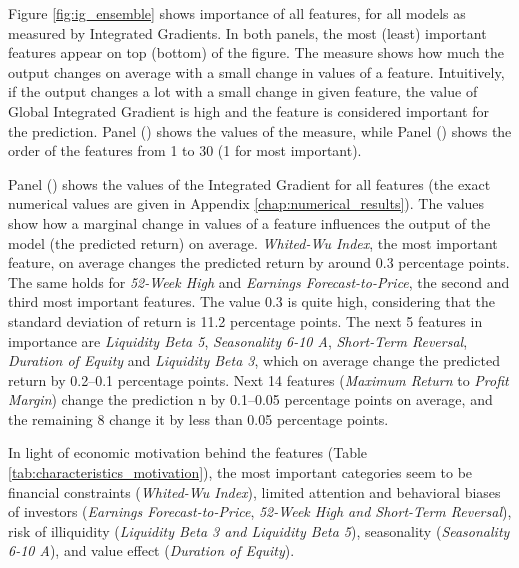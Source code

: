 		Figure \ref{fig:ig_ensemble} shows importance of all features, for all models as measured by Integrated Gradients.  In both panels, the most (least) important features appear on top (bottom) of the figure. The measure shows how much the output changes on average with a small change in values of a feature. Intuitively, if the output changes a lot with a small change in given feature, the value of Global Integrated Gradient is high and the feature is considered important for the prediction. Panel () shows the values of the measure, while Panel () shows the order of the features from 1 to 30 (1 for most important).
		
		Panel () shows the values of the Integrated Gradient for all features (the exact numerical values are given in Appendix \ref{chap:numerical_results}). The values show how a marginal change in values of a feature influences the output of the model (the predicted return) on average. \textit{Whited-Wu Index}, the most important feature, on average changes the predicted return by around 0.3 percentage points. The same holds for \textit{52-Week High} and \textit{Earnings Forecast-to-Price}, the second and third most important features. The value 0.3 is quite high, considering that the standard deviation of return is 11.2 percentage points. The next 5 features in importance are \textit{Liquidity Beta 5}, \textit{Seasonality 6-10 A}, \textit{Short-Term Reversal}, \textit{Duration of Equity} and \textit{Liquidity Beta 3}, which on average change the predicted return by 0.2--0.1 percentage points. Next 14 features (\textit{Maximum Return} to \textit{Profit Margin}) change the prediction n by 0.1--0.05 percentage points on average, and the remaining 8 change it by less than 0.05 percentage points.
		
		In light of economic motivation behind the features (Table \ref{tab:characteristics_motivation}), the most important categories seem to be financial constraints (\textit{Whited-Wu Index}), limited attention and behavioral biases of investors (\textit{Earnings Forecast-to-Price}, \textit{52-Week High and Short-Term Reversal}), risk of illiquidity (\textit{Liquidity Beta 3 and Liquidity Beta 5}), seasonality (\textit{Seasonality 6-10 A}), and value effect (\textit{Duration of Equity}). 
		
